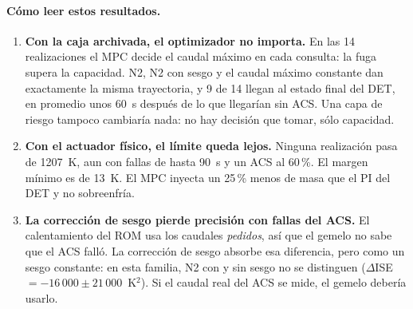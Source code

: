 \paragraph{Cómo leer estos resultados.}
\begin{enumerate}
  \item \textbf{Con la caja archivada, el optimizador no importa.} En las 14 realizaciones
        el MPC decide el caudal máximo en cada consulta: la fuga supera la capacidad. N2, N2
        con sesgo y el caudal máximo constante dan exactamente la misma trayectoria, y 9 de
        14 llegan al estado final del DET, en promedio unos 60~s después de lo que llegarían sin ACS. Una
        capa de riesgo tampoco cambiaría nada: no hay decisión que tomar, sólo capacidad.
  \item \textbf{Con el actuador físico, el límite queda lejos.} Ninguna realización pasa de
        1207~K, aun con fallas de hasta 90~s y un ACS al 60\,\%. El margen mínimo es de 13~K.
        El MPC inyecta un 25\,\% menos de masa que el PI del DET y no sobreenfría.
  \item \textbf{La corrección de sesgo pierde precisión con fallas del ACS.} El calentamiento
        del ROM usa los caudales \emph{pedidos}, así que el gemelo no sabe que el ACS falló.
        La corrección de sesgo absorbe esa diferencia, pero como un sesgo constante: en esta
        familia, N2 con y sin sesgo no se distinguen ($\Delta$ISE $=-16\,000\pm21\,000$~K$^2$).
        Si el caudal real del ACS se mide, el gemelo debería usarlo.
\end{enumerate}


